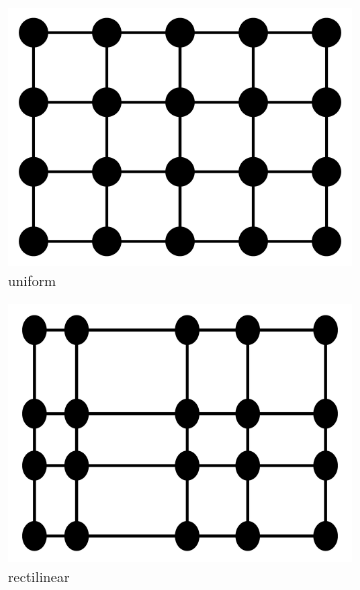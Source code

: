 \begin{figure}
\begin{subfigure}[b]{0.2\textwidth}
    \includegraphics[width=\textwidth]{Images/uniform.pdf}
    \caption{uniform}
    \label{fig:uniform}
  \end{subfigure}
  \begin{subfigure}[b]{0.2\textwidth}
    \includegraphics[width=\textwidth]{Images/rectilinear.pdf}
    \caption{rectilinear}
    \label{fig:rectilinear}
  \end{subfigure}
  \begin{subfigure}[b]{0.19\textwidth}

\end{subfigure}
\end{figure}
